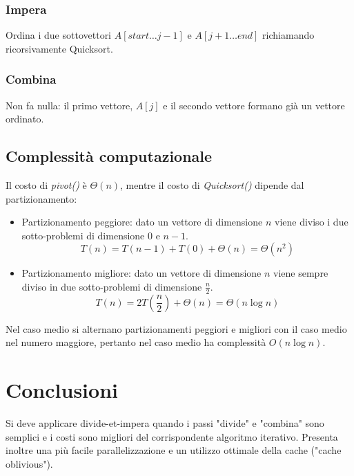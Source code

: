 \subsubsection{Impera}
Ordina i due sottovettori $A[start\dots j-1]$ e $A[j+1\dots end]$ richiamando ricorsivamente Quicksort.
\subsubsection{Combina}
Non fa nulla: il primo vettore, $A[j]$ e il secondo vettore formano gi\`a un vettore ordinato. 
\begin{multicols}{2}

\columnbreak

\end{multicols}
\subsection{Complessit\`a computazionale}
Il costo di \emph{pivot()} \`e $\Theta(n)$, mentre il costo di \emph{Quicksort()} dipende dal partizionamento:
\begin{itemize}
\item Partizionamento peggiore: dato un vettore di dimensione $n$ viene diviso i due sotto-problemi di dimensione $0$ e $n-1$. $$T(n) = T(n-1) + T(0) + 
\Theta(n) = \Theta(n^2)$$
\item Partizionamento migliore: dato un vettore di dimensione $n$ viene sempre diviso in due sotto-problemi di dimensione $\frac{n}{2}$.  $$T(n) = 
2T(\frac{n}{2}) + \Theta(n) = \Theta(n\log n)$$
\end{itemize}
Nel caso medio si alternano partizionamenti peggiori e migliori con il caso medio nel numero maggiore, pertanto nel caso medio ha complessit\`a $O(n\log n)
$.
\section{Conclusioni}
Si deve applicare divide-et-impera quando i passi "divide" e "combina" sono semplici e i costi sono migliori del corrispondente algoritmo iterativo. Presenta inoltre una pi\`u facile parallelizzazione e un utilizzo
ottimale della cache ("cache oblivious"). 
